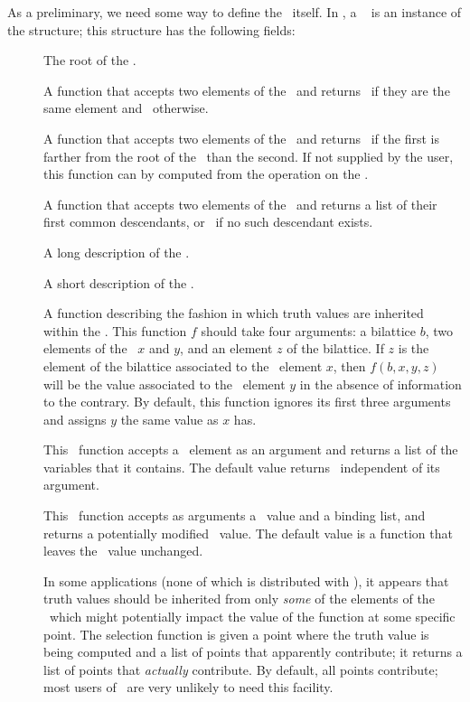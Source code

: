 As a preliminary, we need some way to define the \dg\ itself.  In
\mvl, a \dg\  is an instance of the  structure;
this structure has the following fields:
 \begin{description}
 \item [] The root of the \dg.
 \item [] A function that accepts two elements of the \dg\
and returns \T\ if they are the same element and \NIL\ otherwise.
 \item [\itype{leq}] A function that accepts two elements of the \dg\
and returns \T\ if the first is farther from the root of the \dg\
than the second.  If not supplied by the user, this function can by
computed from the \type{dot} operation on the \dg.
 \item [\itype{dot}] A function that accepts two elements of the \dg\
and returns a list of their first common descendants, or \NIL\ if no
such descendant exists.
 \item [\itype{long}] A long description of the \dg.
 \item [\itype{short}] A short description of the \dg.
 \item [\itype{inherit}] A function describing the fashion in which
truth values are inherited within the \dg.  This function $f$ should take
four arguments: a bilattice $b$, two elements of the \dg\ $x$ and $y$,
and an element $z$ of the bilattice.  If $z$ is the element of the
bilattice associated to the \dg\ element $x$, then $f(b,x,y,z)$ will
be the value associated to the \dg\ element $y$ in the absence of
information to the contrary.  By default, this function ignores
its first three arguments and assigns $y$ the same value as $x$ has.
 \item [\type{vars}] This \lisp\ function accepts a \dg\ element
as an argument and returns a list of the variables that it contains.
The default value returns \NIL\ independent of its argument.
 \item [\type{plug}] This \lisp\ function accepts as arguments a
\dg\ value and a binding list, and returns a potentially modified
\dg\ value.  The default value is a function that leaves the \dg\
value unchanged.
 \item [\type{select}] In some applications (none of which is distributed
with \mvl), it appears that truth values should be inherited from only
{\em some\/} of the elements of the \dg\ which might potentially
impact the value of the function at some specific point.  The
selection function is given a point where the truth value is being
computed and a list of points that apparently contribute; it returns a
list of points that {\em actually\/} contribute.  By default, all
points contribute; most users of \mvl\ are very unlikely to need this
facility.
 \end{description}

